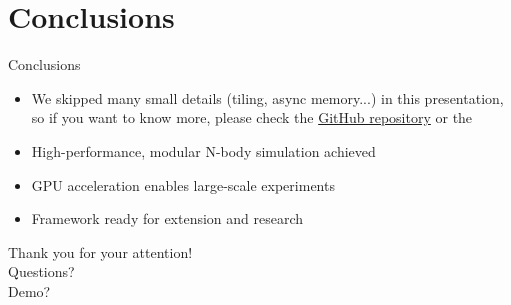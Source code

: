 \documentclass{beamer}
\begin{document}
\section{Conclusions}
\begin{frame}{Conclusions}
    \begin{itemize}
        \item We skipped many small details (tiling, async memory...) in this presentation, so if you want to know more, please check the \href{}{GitHub repository} or the
        \item High-performance, modular N-body simulation achieved
        \item GPU acceleration enables large-scale experiments
        \item Framework ready for extension and research
    \end{itemize}
\end{frame}

\begin{emptyframe}
    \centering
    Thank you for your attention! \\
    Questions? \\
    Demo?
\end{emptyframe}
\end{document}
